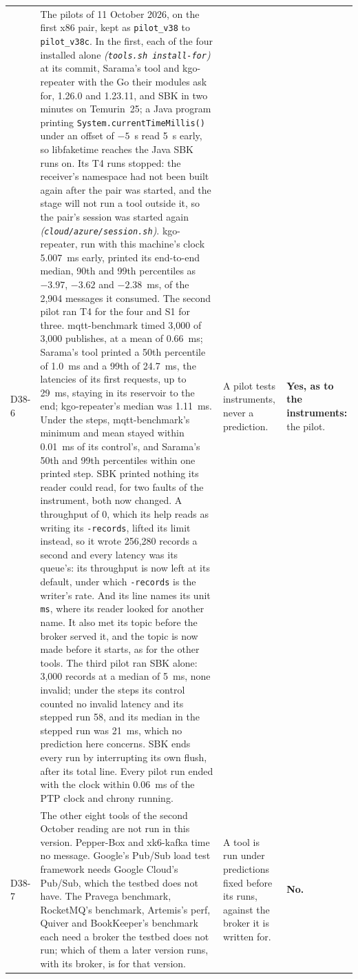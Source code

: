 \documentclass[11pt]{article}
\newcommand{\gl}[1]{{\color{soft}\itshape\small (#1)}}
\begin{document}
{\begin{longtable}{@{}p{1.1cm} >{\raggedright\arraybackslash}p{6.1cm} >{\raggedright\arraybackslash}p{6.0cm} >{\raggedright\arraybackslash}p{2.2cm}@{}}
D38-6 & The pilots of 11 October 2026, on the first x86 pair, kept as \texttt{pilot\_v38} to \texttt{pilot\_v38c}. In the first, each of the four installed alone \gl{\texttt{tools.sh install-for}} at its commit, Sarama's tool and kgo-repeater with the Go their modules ask for, 1.26.0 and 1.23.11, and SBK in two minutes on Temurin~25; a Java program printing \texttt{System.currentTimeMillis()} under an offset of $-5$~s read 5~s early, so libfaketime reaches the Java SBK runs on. Its T4 runs stopped: the receiver's namespace had not been built again after the pair was started, and the stage will not run a tool outside it, so the pair's session was started again \gl{\texttt{cloud/azure/session.sh}}. kgo-repeater, run with this machine's clock 5.007~ms early, printed its end-to-end median, 90th and 99th percentiles as $-3.97$, $-3.62$ and $-2.38$~ms, of the 2,904 messages it consumed. The second pilot ran T4 for the four and S1 for three. mqtt-benchmark timed 3,000 of 3,000 publishes, at a mean of 0.66~ms; Sarama's tool printed a 50th percentile of 1.0~ms and a 99th of 24.7~ms, the latencies of its first requests, up to 29~ms, staying in its reservoir to the end; kgo-repeater's median was 1.11~ms. Under the steps, mqtt-benchmark's minimum and mean stayed within 0.01~ms of its control's, and Sarama's 50th and 99th percentiles within one printed step. SBK printed nothing its reader could read, for two faults of the instrument, both now changed. A throughput of 0, which its help reads as writing its \texttt{-records}, lifted its limit instead, so it wrote 256,280 records a second and every latency was its queue's: its throughput is now left at its default, under which \texttt{-records} is the writer's rate. And its line names its unit \texttt{ms}, where its reader looked for another name. It also met its topic before the broker served it, and the topic is now made before it starts, as for the other tools. The third pilot ran SBK alone: 3,000 records at a median of 5~ms, none invalid; under the steps its control counted no invalid latency and its stepped run 58, and its median in the stepped run was 21~ms, which no prediction here concerns. SBK ends every run by interrupting its own flush, after its total line. Every pilot run ended with the clock within 0.06~ms of the PTP clock and chrony running. & A pilot tests instruments, never a prediction. & \textbf{Yes, as to the instruments:} the pilot. \\
D38-7 & The other eight tools of the second October reading are not run in this version. Pepper-Box and xk6-kafka time no message. Google's Pub/Sub load test framework needs Google Cloud's Pub/Sub, which the testbed does not have. The Pravega benchmark, RocketMQ's benchmark, Artemis's perf, Quiver and BookKeeper's benchmark each need a broker the testbed does not run; which of them a later version runs, with its broker, is for that version. & A tool is run under predictions fixed before its runs, against the broker it is written for. & \textbf{No.} \\

\end{longtable}}
\end{document}
